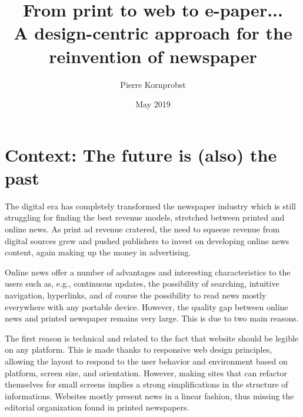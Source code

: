 \documentclass[10pt]{article}
\title{{\bfseries From print to web to e-paper...}\\A design-centric approach for the reinvention of newspaper}
\author{Pierre Kornprobst}
\date{May 2019}
\begin{document}
\maketitle

\section{Context: The future is (also) the past}

The digital era has completely transformed the newspaper industry which is still struggling for finding the best revenue models, stretched between printed and online news.
As print ad revenue cratered, the need to squeeze revenue from digital sources grew and pushed publishers to invest on developing online news content, again making up the money in advertising.

Online news offer a number of advantages and interesting characteristics to the users such as, e.g.,  continuous updates, the possibility of searching, intuitive navigation,  hyperlinks, and of course the possibility to read news mostly everywhere with any portable device. 
However, the quality gap between online news and printed newspaper remains very large. 
This is due to two main reasons.

The first reason is technical and related to the fact that website should be legible on any platform. This is made thanks to responsive web design principles, allowing the layout to respond to the user behavior and environment based on platform, screen size, and orientation.
However, making sites that can refactor themselves for small screens implies a strong simplifications in the structure of informations.
Websites mostly present news in a linear fashion, thus missing the editorial organization found in printed newspapers.
\end{document}
